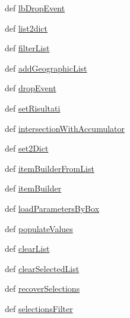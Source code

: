 \begin{DoxyCompactItemize}
\item 
def \hyperlink{classmmasgis_1_1interrogazioni_1_1MainWindowQuery_a5ec39a3f23caf4352dcd39c702766386}{lbDropEvent}
\item 
def \hyperlink{classmmasgis_1_1interrogazioni_1_1MainWindowQuery_ab33ce8a5047f147e774ca7b8de7daa4f}{list2dict}
\item 
def \hyperlink{classmmasgis_1_1interrogazioni_1_1MainWindowQuery_afad19db057a45d9dd4c9ea6c200a379b}{filterList}
\item 
def \hyperlink{classmmasgis_1_1interrogazioni_1_1MainWindowQuery_a06abafb2f0dc28207e5861014775ceec}{addGeographicList}
\item 
def \hyperlink{classmmasgis_1_1interrogazioni_1_1MainWindowQuery_a09f8a5e613a6c8245d418760ad2c987c}{dropEvent}
\item 
def \hyperlink{classmmasgis_1_1interrogazioni_1_1MainWindowQuery_a781ea2d0e974c05d579cf2009152506c}{setRisultati}
\item 
def \hyperlink{classmmasgis_1_1interrogazioni_1_1MainWindowQuery_abd4ac36f18bc9563c308f3113fcdc97b}{intersectionWithAccumulator}
\item 
def \hyperlink{classmmasgis_1_1interrogazioni_1_1MainWindowQuery_ad10acacfce64174b5f579bde43e92c68}{set2Dict}
\item 
def \hyperlink{classmmasgis_1_1interrogazioni_1_1MainWindowQuery_ab78e4ab50bb45ea0e7d4fe1d79bc76ce}{itemBuilderFromList}
\item 
def \hyperlink{classmmasgis_1_1interrogazioni_1_1MainWindowQuery_a80a5fc1d87cd49d9ec2e56f8ac9520b4}{itemBuilder}
\item 
def \hyperlink{classmmasgis_1_1interrogazioni_1_1MainWindowQuery_a87705653e49c6978be63da465d5a539e}{loadParametersByBox}
\item 
def \hyperlink{classmmasgis_1_1interrogazioni_1_1MainWindowQuery_a2eaf5d81ebe4b52e76bb3fadeb50a85b}{populateValues}
\item 
def \hyperlink{classmmasgis_1_1interrogazioni_1_1MainWindowQuery_a20f86a528986f58adada73bcb26987f9}{clearList}
\item 
def \hyperlink{classmmasgis_1_1interrogazioni_1_1MainWindowQuery_a4258666992260ce6c2d5ebcbfd4cdefa}{clearSelectedList}
\item 
def \hyperlink{classmmasgis_1_1interrogazioni_1_1MainWindowQuery_a7370871f746eeec0d89306c3c804944b}{recoverSelections}
\item 
def \hyperlink{classmmasgis_1_1interrogazioni_1_1MainWindowQuery_aa32d242ee7a48be7df056dc89ec325e4}{selectionsFilter}

\end{DoxyCompactItemize}
